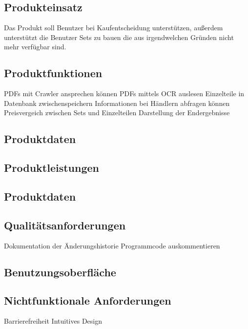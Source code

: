 \subsection{Produkteinsatz}
 Das Produkt soll Benutzer bei Kaufentscheidung unterstützen, außerdem unterstützt die Benutzer Sets zu bauen die aus irgendwelchen Gründen nicht mehr verfügbar sind.\newline

\subsection{Produktfunktionen}
PDFs mit Crawler ansprechen können \newline
PDFs mittels OCR auslesen \newline
Einzelteile in Datenbank zwischenspeichern \newline
Informationen bei Händlern abfragen können \newline
Preisvergeich zwischen Sets und Einzelteilen \newline
Darstellung der Endergebnisse \newline

\subsection{Produktdaten}

\subsection{Produktleistungen}

\subsection{Produktdaten}

\subsection{Qualitätsanforderungen}
Dokumentation der Änderungshistorie \newline
Programmcode auskommentieren \newline

\subsection{Benutzungsoberfläche}

\subsection{Nichtfunktionale Anforderungen}
Barrierefreiheit \newline
Intuitives Design \newline

